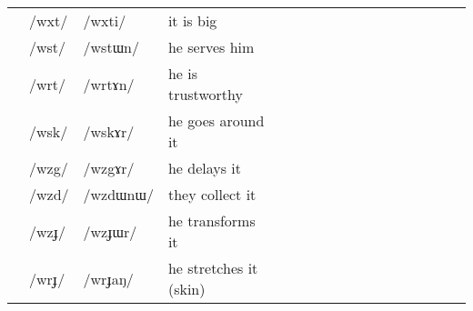 \documentclass[oldfontcommands,oneside,a4paper,11pt]{article}
\newcommand{\ipa}[1]{\mbox{/#1/}} %
\newcommand{\trois}[1]{/#1/}
\newcommand{\tib}[1]{\cellcolor{lightgray}\textbf{#1}}
\begin{document}
\begin{landscape}
\begin{longtable}{l|lll|lll|lll|lllllll}
\midrule
&	\trois{wxt}  &	\ipa{wxti}  &it is big	\\
&	\trois{wst} \tib{} &	\ipa{wstɯn}  &he serves him	\\
&	\trois{wrt}  \tib{} &	\ipa{wrtɤn}  &	he is trustworthy\\
&	\trois{wsk}  \tib{} &	\ipa{wskɤr}  & he goes around it	\\
&	\trois{wzg}  \tib{} &	\ipa{wzgɤr}  & he delays it	\\
&	\trois{wzd}  \tib{} &	\ipa{wzdɯnɯ}  & they collect it	\\
&	\trois{wzɟ}  \tib{} &	\ipa{wzɟɯr}  & he transforms it	\\
&	\trois{wrɟ}  \tib{} &	\ipa{wrɟaŋ}  &he stretches it (skin)	\\
\bottomrule
\end{longtable}


\end{landscape}
\end{document}

